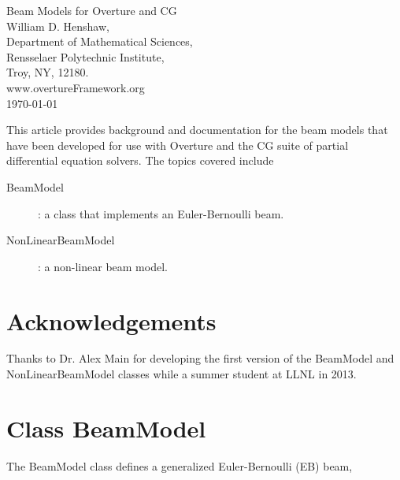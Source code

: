 \documentclass[11pt]{article}
\begin{document}
\baselineskip
\begin{flushleft}
{\LARGE Beam Models for Overture and CG} \\
\vspace{2\baselineskip}
William D. Henshaw, \\
Department of Mathematical Sciences, \\
Rensselaer Polytechnic Institute,     \\
Troy, NY, 12180.  \\
www.overtureFramework.org \\
\vspace{2\baselineskip}
\today
\vspace{4\baselineskip}
% 
\end{flushleft}
%
%
 This article provides background and documentation for
the beam models that have been developed for use with Overture and the CG suite of partial differential
equation solvers. The topics covered include
\begin{description}
  \item[BeamModel] : a class that implements an Euler-Bernoulli beam.
  \item[NonLinearBeamModel] : a non-linear beam model.
\end{description}


\clearpage
\tableofcontents
\section{Acknowledgements}

Thanks to Dr. Alex Main for developing the first version of the BeamModel and NonLinearBeamModel classes while
a summer student at LLNL in 2013.

\section{Class BeamModel}\label{sec:BeamModel}

The BeamModel class defines a generalized Euler-Bernoulli (EB) beam,
\end{document}
